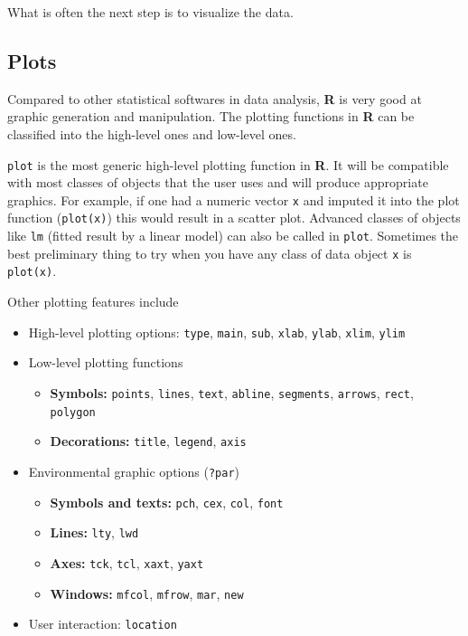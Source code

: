 \documentclass[
]{article}
\providecommand{\tightlist}{%
  \setlength{\itemsep}{0pt}\setlength{\parskip}{0pt}}
\begin{document}
What is often the next step is to visualize the data.

\hypertarget{plots}{%
\subsection{Plots}\label{plots}}

Compared to other statistical softwares in data analysis, \textbf{R} is
very good at graphic generation and manipulation. The plotting functions
in \textbf{R} can be classified into the high-level ones and low-level
ones.

\texttt{plot} is the most generic high-level plotting function in
\textbf{R}. It will be compatible with most classes of objects that the
user uses and will produce appropriate graphics. For example, if one had
a numeric vector \texttt{x} and imputed it into the plot function
(\texttt{plot(x)}) this would result in a scatter plot. Advanced classes
of objects like \texttt{lm} (fitted result by a linear model) can also
be called in \texttt{plot}. Sometimes the best preliminary thing to try
when you have any class of data object \texttt{x} is \texttt{plot(x)}.

Other plotting features include

\begin{itemize}
\tightlist
\item
  High-level plotting options: \texttt{type}, \texttt{main},
  \texttt{sub}, \texttt{xlab}, \texttt{ylab}, \texttt{xlim},
  \texttt{ylim}
\item
  Low-level plotting functions

  \begin{itemize}
  \tightlist
  \item
    \textbf{Symbols:} \texttt{points}, \texttt{lines}, \texttt{text},
    \texttt{abline}, \texttt{segments}, \texttt{arrows}, \texttt{rect},
    \texttt{polygon}
  \item
    \textbf{Decorations:} \texttt{title}, \texttt{legend}, \texttt{axis}
  \end{itemize}
\item
  Environmental graphic options (\texttt{?par})

  \begin{itemize}
  \tightlist
  \item
    \textbf{Symbols and texts:} \texttt{pch}, \texttt{cex},
    \texttt{col}, \texttt{font}
  \item
    \textbf{Lines:} \texttt{lty}, \texttt{lwd}
  \item
    \textbf{Axes:} \texttt{tck}, \texttt{tcl}, \texttt{xaxt},
    \texttt{yaxt}
  \item
    \textbf{Windows:} \texttt{mfcol}, \texttt{mfrow}, \texttt{mar},
    \texttt{new}
  \end{itemize}
\item
  User interaction: \texttt{location}
\end{itemize}
\end{document}
